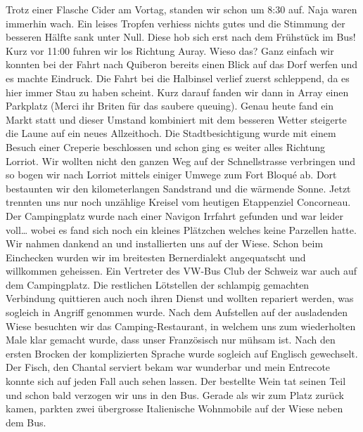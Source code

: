 Trotz einer Flasche Cider am Vortag, standen wir schon um 8:30 auf.
Naja waren immerhin wach.
Ein leises Tropfen verhiess nichts gutes und die Stimmung der besseren Hälfte sank unter Null.
Diese hob sich erst nach dem Frühstück im Bus! 
Kurz vor 11:00 fuhren wir los Richtung \glqq Auray\grqq{}.
Wieso das? Ganz einfach wir konnten bei der Fahrt nach Quiberon bereits einen Blick auf das Dorf werfen und es machte Eindruck.
Die Fahrt bei die Halbinsel verlief zuerst schleppend, da es hier immer Stau zu haben scheint.
Kurz darauf fanden wir dann in Array einen Parkplatz (Merci ihr Briten für das saubere queuing).
Genau heute fand ein Markt statt und dieser Umstand kombiniert mit dem besseren Wetter steigerte die Laune auf ein neues Allzeithoch.
Die Stadtbesichtigung wurde mit einem Besuch einer Creperie beschlossen und schon ging es weiter alles Richtung Lorriot.
Wir wollten nicht den ganzen Weg auf der Schnellstrasse verbringen und so bogen wir nach Lorriot mittels einiger Umwege zum Fort Bloqué ab.
Dort bestaunten wir den kilometerlangen Sandstrand und die wärmende Sonne.
Jetzt trennten uns nur noch unzählige Kreisel vom heutigen Etappenziel \glqq Concorneau\grqq{}.
Der Campingplatz wurde nach einer Navigon Irrfahrt gefunden und war leider voll\dots{}  wobei es fand sich noch ein \glqq kleines\grqq{} Plätzchen welches keine Parzellen hatte.
Wir nahmen dankend an und installierten uns auf der Wiese.
Schon beim Einchecken wurden wir im breitesten Bernerdialekt angequatscht und willkommen geheissen.
Ein Vertreter des VW-Bus Club der Schweiz war auch auf dem Campingplatz.
Die restlichen Lötstellen der schlampig gemachten Verbindung quittieren auch noch ihren Dienst und wollten repariert werden, was sogleich in Angriff genommen wurde.
Nach dem Aufstellen auf der ausladenden Wiese besuchten wir das Camping-Restaurant, in welchem uns zum wiederholten Male klar gemacht wurde, dass unser Französisch nur mühsam ist.
Nach den ersten Brocken der komplizierten Sprache wurde sogleich auf Englisch gewechselt.
Der Fisch, den Chantal serviert bekam war wunderbar und mein Entrecote konnte sich auf jeden Fall auch sehen lassen.
Der bestellte Wein tat seinen Teil und schon bald verzogen wir uns in den Bus.
Gerade als wir zum Platz zurück kamen, parkten zwei übergrosse Italienische Wohnmobile auf der Wiese neben dem Bus.

